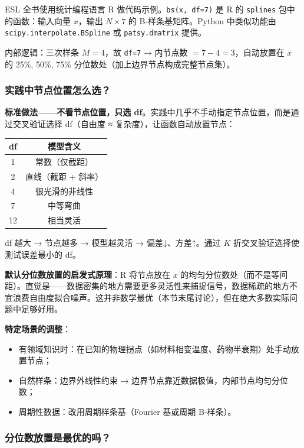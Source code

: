 ESL 全书使用统计编程语言 R 做代码示例。\texttt{bs(x, df=7)} 是 R 的 \texttt{splines} 包中的函数：输入向量 $x$，输出 $N \times 7$ 的 B-样条基矩阵。Python 中类似功能由 \texttt{scipy.interpolate.BSpline} 或 \texttt{patsy.dmatrix} 提供。

内部逻辑：三次样条 $M=4$，故 \texttt{df=7} → 内节点数 $= 7-4 = 3$，自动放置在 $x$ 的 25\%, 50\%, 75\% 分位数处（加上边界节点构成完整节点集）。

\subsubsection{实践中节点位置怎么选？}

\textbf{标准做法——不看节点位置，只选 df}。实践中几乎不手动指定节点位置，而是通过交叉验证选择 df（自由度 ≈ 复杂度），让函数自动放置节点：

\begin{center}
\begin{tabular}{c|c}
\toprule
df & 模型含义 \\
\midrule
1 & 常数（仅截距） \\
2 & 直线（截距 + 斜率） \\
4 & 很光滑的非线性 \\
7 & 中等弯曲 \\
12 & 相当灵活 \\
\bottomrule
\end{tabular}
\end{center}

df 越大 → 节点越多 → 模型越灵活 → 偏差↓、方差↑。通过 $K$ 折交叉验证选择使测试误差最小的 df。

\textbf{默认分位数放置的启发式原理}：R 将节点放在 $x$ 的均匀分位数处（而不是等间距）。直觉是——数据密集的地方需要更多灵活性来捕捉信号，数据稀疏的地方不宜浪费自由度拟合噪声。这并非数学最优（本节末尾讨论），但在绝大多数实际问题中足够好用。

\textbf{特定场景的调整}：
\begin{itemize}
    \item 有领域知识时：在已知的物理拐点（如材料相变温度、药物半衰期）处手动放置节点；
    \item 自然样条：边界外线性约束 → 边界节点靠近数据极值，内部节点均匀分位数；
    \item 周期性数据：改用周期样条基（Fourier 基或周期 B-样条）。
\end{itemize}

\subsubsection{分位数放置是最优的吗？}

